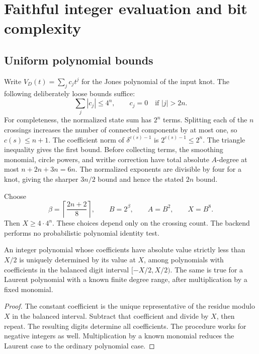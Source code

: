 \section{Faithful integer evaluation and bit complexity}
\label{sec:encoding}

\subsection{Uniform polynomial bounds}

Write $V_D(t)=\sum_j c_jt^j$ for the Jones polynomial of the input knot.
The following deliberately loose bounds suffice:
\begin{equation}\label{eq:coefficient-bounds}
 \sum_j|c_j|\le4^n,
 \qquad c_j=0\quad\text{if }|j|>2n.
\end{equation}
For completeness, the normalized state sum has $2^n$ terms. Splitting each
of the $n$ crossings increases the number of connected components by at
most one, so $c(s)\le n+1$. The coefficient norm of
$\delta^{c(s)-1}$ is $2^{c(s)-1}\le2^n$. The triangle inequality gives
the first bound. Before collecting terms, the smoothing monomial,
circle powers, and writhe correction have total absolute $A$-degree at
most $n+2n+3n=6n$. The normalized exponents are divisible by four for a
knot, giving the sharper $3n/2$ bound and hence the stated $2n$ bound.

Choose
\begin{equation}\label{eq:integer-base}
 \beta=\left\lceil\frac{2n+2}{8}\right\rceil,
 \qquad B=2^\beta,
 \qquad A=B^2,
 \qquad X=B^8.
\end{equation}
Then $X\ge4\cdot4^n$. These choices depend only on the crossing count.
The backend performs no probabilistic polynomial identity test.

\begin{lemma}
\label{lem:balanced-injective}
An integer polynomial whose coefficients have absolute value strictly
less than $X/2$ is uniquely determined by its value at $X$, among
polynomials with coefficients in the balanced digit interval
$[-X/2,X/2)$. The same is true for a Laurent polynomial with a known
finite degree range, after multiplication by a fixed monomial.
\end{lemma}

\begin{proof}
The constant coefficient is the unique representative of the residue
modulo $X$ in the balanced interval. Subtract that coefficient and divide
by $X$, then repeat. The resulting digits determine all coefficients.
The procedure works for negative integers as well. Multiplication by a
known monomial reduces the Laurent case to the ordinary polynomial case.
\end{proof}


